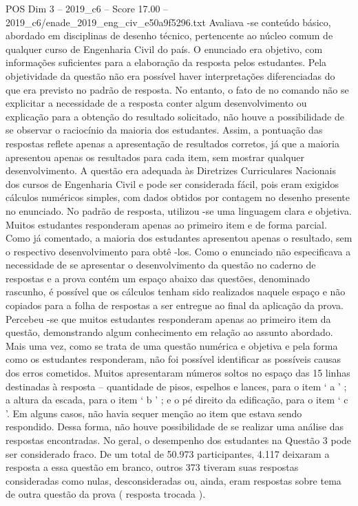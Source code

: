\begin{textsample}{POS Dim 3 – 2019\_c6 – Score 17.00 – 2019\_c6/enade\_2019\_eng\_civ\_e50a9f5296.txt}
Avaliava -se conteúdo básico, abordado em disciplinas de desenho técnico, pertencente ao núcleo comum de qualquer curso de Engenharia Civil do país.
O enunciado era objetivo, com informações suficientes para a elaboração da resposta pelos estudantes.
Pela objetividade da questão não era possível haver interpretações diferenciadas do que era previsto no padrão de resposta.
No entanto, o fato de no comando não se explicitar a necessidade de a resposta conter algum desenvolvimento ou explicação para a obtenção do resultado solicitado, não houve a possibilidade de se observar o raciocínio da maioria dos estudantes.
Assim, a pontuação das respostas reflete apenas a apresentação de resultados corretos, já que a maioria apresentou apenas os resultados para cada item, sem mostrar qualquer desenvolvimento.
A questão era adequada às Diretrizes Curriculares Nacionais dos cursos de Engenharia Civil e pode ser considerada fácil, pois eram exigidos cálculos numéricos simples, com dados obtidos por contagem no desenho presente no enunciado.
No padrão de resposta, utilizou -se uma linguagem clara e objetiva.
Muitos estudantes responderam apenas ao primeiro item e de forma parcial.
Como já comentado, a maioria dos estudantes apresentou apenas o resultado, sem o respectivo desenvolvimento para obtê -los.
Como o enunciado não especificava a necessidade de se apresentar o desenvolvimento da questão no caderno de respostas e a prova contém um espaço abaixo das questões, denominado rascunho, é possível que os cálculos tenham sido realizados naquele espaço e não copiados para a folha de respostas a ser entregue ao final da aplicação da prova.
Percebeu -se que muitos estudantes responderam apenas ao primeiro item da questão, demonstrando algum conhecimento em relação ao assunto abordado.
Mais uma vez, como se trata de uma questão numérica e objetiva e pela forma como os estudantes responderam, não foi possível identificar as possíveis causas dos erros cometidos.
Muitos apresentaram números soltos no espaço das 15 linhas destinadas à resposta – quantidade de pisos, espelhos e lances, para o item ‘ a ’ ; a altura da escada, para o item ‘ b ’ ; e o pé direito da edificação, para o item ‘ c ’.
Em alguns casos, não havia sequer menção ao item que estava sendo respondido.
Dessa forma, não houve possibilidade de se realizar uma análise das respostas encontradas.
No geral, o desempenho dos estudantes na Questão 3 pode ser considerado fraco.
De um total de 50.973 participantes, 4.117 deixaram a resposta a essa questão em branco, outros 373 tiveram suas respostas consideradas como nulas, desconsideradas ou, ainda, eram respostas sobre tema de outra questão da prova ( resposta trocada ).

\end{textsample}
